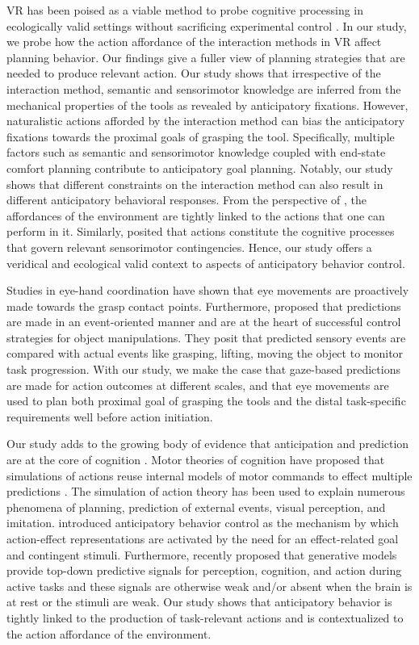 VR has been poised as a viable method to probe cognitive processing in ecologically valid settings without sacrificing experimental control \citep{Parsons2015-eo}. In our study, we probe how the action affordance of the interaction methods in VR affect planning behavior. Our findings give a fuller view of planning strategies that are needed to produce relevant action. Our study shows that irrespective of the interaction method, semantic and sensorimotor knowledge are inferred from the mechanical properties of the tools as revealed by anticipatory fixations. However, naturalistic actions afforded by the interaction method can bias the anticipatory fixations towards the proximal goals of grasping the tool. Specifically, multiple factors such as semantic and sensorimotor knowledge coupled with end-state comfort planning contribute to anticipatory goal planning. Notably, our study shows that different constraints on the interaction method can also result in different anticipatory behavioral responses. From the perspective of \citet{Gibson1977-zj}, the affordances of the environment are tightly linked to the actions that one can perform in it. Similarly, \citet{ORegan2001-pd} posited that actions constitute the cognitive processes that govern relevant sensorimotor contingencies. Hence, our study offers a veridical and ecological valid context to aspects of anticipatory behavior control.

Studies in eye-hand coordination \citep{Johansson2001-sa, Lohmann2019-fy, Belardinelli2018-xm} have shown that eye movements are proactively made towards the grasp contact points. Furthermore, \citet{Flanagan2006-ql} proposed that predictions are made in an event-oriented manner and are at the heart of successful control strategies for object manipulations. They posit that predicted sensory events are compared with actual events like grasping, lifting, moving the object to monitor task progression. With our study, we make the case that gaze-based predictions are made for action outcomes at different scales, and that eye movements are used to plan both proximal goal of grasping the tools and the distal task-specific requirements well before action initiation. 

Our study adds to the growing body of evidence that anticipation and prediction are at the core of cognition \citep{Pezzulo2007-ot}. Motor theories of cognition have proposed that simulations of actions reuse internal models of motor commands to effect multiple predictions \citep{Jeannerod2006-dt}. The simulation of action theory has been used to explain numerous phenomena of planning, prediction of external events, visual perception, and imitation. \citet{Hoffmann2003-ur} introduced anticipatory behavior control as the mechanism by which action-effect representations are activated by the need for an effect-related goal and contingent stimuli. Furthermore, \citet{Pezzulo2021-te} recently proposed that generative models provide top-down predictive signals for perception, cognition, and action during active tasks and these signals are otherwise weak and/or absent when the brain is at rest or the stimuli are weak. Our study shows that anticipatory behavior is tightly linked to the production of task-relevant actions and is contextualized to the action affordance of the environment.

